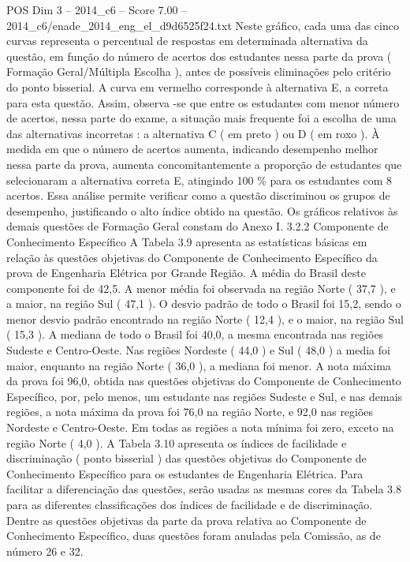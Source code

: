 \begin{textsample}{POS Dim 3 – 2014\_c6 – Score 7.00 – 2014\_c6/enade\_2014\_eng\_el\_d9d6525f24.txt}
Neste gráfico, cada uma das cinco curvas representa o percentual de respostas em determinada alternativa da questão, em função do número de acertos dos estudantes nessa parte da prova ( Formação Geral/Múltipla Escolha ), antes de possíveis eliminações pelo critério do ponto bisserial.
A curva em vermelho corresponde à alternativa E, a correta para esta questão.
Assim, observa -se que entre os estudantes com menor número de acertos, nessa parte do exame, a situação mais frequente foi a escolha de uma das alternativas incorretas : a alternativa C ( em preto ) ou D ( em roxo ).
À medida em que o número de acertos aumenta, indicando desempenho melhor nessa parte da prova, aumenta concomitantemente a proporção de estudantes que selecionaram a alternativa correta E, atingindo 100 \% para os estudantes com 8 acertos.
Essa análise permite verificar como a questão discriminou os grupos de desempenho, justificando o alto índice obtido na questão.
Os gráficos relativos às demais questões de Formação Geral constam do Anexo I. 3.2.2 Componente de Conhecimento Específico A Tabela 3.9 apresenta as estatísticas básicas em relação às questões objetivas do Componente de Conhecimento Específico da prova de Engenharia Elétrica por Grande Região.
A média do Brasil deste componente foi de 42,5.
A menor média foi observada na região Norte ( 37,7 ), e a maior, na região Sul ( 47,1 ).
O desvio padrão de todo o Brasil foi 15,2, sendo o menor desvio padrão encontrado na região Norte ( 12,4 ), e o maior, na região Sul ( 15,3 ).
A mediana de todo o Brasil foi 40,0, a mesma encontrada nas regiões Sudeste e Centro-Oeste.
Nas regiões Nordeste ( 44,0 ) e Sul ( 48,0 ) a media foi maior, enquanto na região Norte ( 36,0 ), a mediana foi menor.
A nota máxima da prova foi 96,0, obtida nas questões objetivas do Componente de Conhecimento Específico, por, pelo menos, um estudante nas regiões Sudeste e Sul, e nas demais regiões, a nota máxima da prova foi 76,0 na região Norte, e 92,0 nas regiões Nordeste e Centro-Oeste.
Em todas as regiões a nota mínima foi zero, exceto na região Norte ( 4,0 ).
A Tabela 3.10 apresenta os índices de facilidade e discriminação ( ponto bisserial ) das questões objetivas do Componente de Conhecimento Específico para os estudantes de Engenharia Elétrica.
Para facilitar a diferenciação das questões, serão usadas as mesmas cores da Tabela 3.8 para as diferentes classificações dos índices de facilidade e de discriminação.
Dentre as questões objetivas da parte da prova relativa ao Componente de Conhecimento Específico, duas questões foram anuladas pela Comissão, as de número 26 e 32.

\end{textsample}
